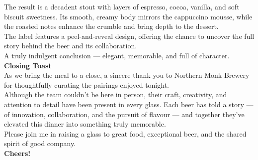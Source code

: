 \documentclass{lodgebrand}
\begin{document}
The result is a decadent stout with layers of espresso, cocoa, vanilla, and soft biscuit sweetness. Its smooth, creamy body mirrors the cappuccino mousse, while the roasted notes enhance the crumble and bring depth to the dessert.\\
The label features a peel-and-reveal design, offering the chance to uncover the full story behind the beer and its collaboration.\\
A truly indulgent conclusion — elegant, memorable, and full of character.\\

\vspace{4pt}\noindent{\color{black}\rule{\linewidth}{0.4pt}}\vspace{6pt}
\textbf{Closing Toast}\\
As we bring the meal to a close, a sincere thank you to Northern Monk Brewery for thoughtfully curating the pairings enjoyed tonight.\\
Although the team couldn't be here in person, their craft, creativity, and attention to detail have been present in every glass. Each beer has told a story — of innovation, collaboration, and the pursuit of flavour — and together they've elevated this dinner into something truly memorable.\\

Please join me in raising a glass to great food, exceptional beer, and the shared spirit of good company.\\

\textbf{Cheers!}
\newpage
{}
\newpage
{}
\newpage
{}
\newpage
{}
\newpage
{}
\newpage
{}
\newpage
{}
\newpage
{}
\newpage
{}
\newpage
{}
\end{document}
